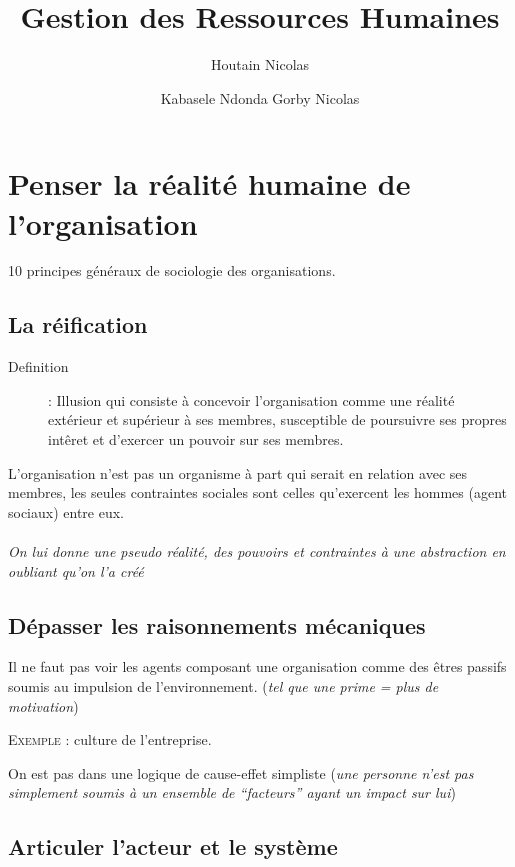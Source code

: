 \documentclass[11pt]{article} %
\title{Gestion des Ressources Humaines}
\author{Houtain Nicolas \and Kabasele Ndonda Gorby Nicolas}
\begin{document}
\maketitle

\section{Penser la réalité humaine de l'organisation}

10 principes généraux de sociologie des organisations.

\subsection{La réification}
\begin{description}
    \item[Definition]   :    Illusion   qui   consiste    à   concevoir
l'organisation  comme  une réalité  extérieur  et  supérieur à  ses
membres, susceptible de  poursuivre ses propres intêret  et d'exercer un
pouvoir sur ses membres.
\end{description}

L'organisation n'est  pas un  organisme à part  qui serait  en relation
avec  ses   membres,  les   seules  contraintes  sociales   sont  celles
qu'exercent les hommes (agent sociaux) entre eux.

\paragraph{ } \textit{On lui donne une pseudo réalité, des pouvoirs et
contraintes à une abstraction en oubliant qu'on l'a créé}


\subsection{Dépasser les raisonnements mécaniques} Il ne faut pas voir
les agents composant une organisation comme des êtres passifs soumis au
impulsion  de l'environnement.  (\textit{tel  que une  prime  = plus  de
motivation})

\textsc{Exemple} : culture de l'entreprise.

On est pas dans une logique de cause-effet simpliste (\textit{une
personne n'est pas simplement soumis à un ensemble de ``facteurs''
ayant un impact sur lui})


\subsection{Articuler l'acteur et le système}
\end{document}
